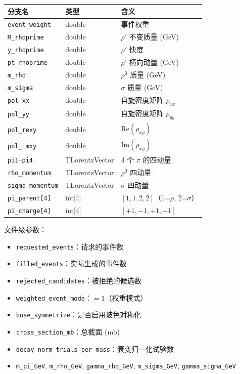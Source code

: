 \documentclass[11pt,a4paper,UTF8]{ctexart}
\begin{document}
\begin{longtable}{l l p{5cm}}
\toprule
\textbf{分支名} & \textbf{类型} & \textbf{含义} \\
\midrule
\texttt{event\_weight} & double & 事件权重 \\
\texttt{M\_rhoprime} & double & $\rho'$ 不变质量 (GeV) \\
\texttt{y\_rhoprime} & double & $\rho'$ 快度 \\
\texttt{pt\_rhoprime} & double & $\rho'$ 横向动量 (GeV) \\
\texttt{m\_rho} & double & $\rho^0$ 质量 (GeV) \\
\texttt{m\_sigma} & double & $\sigma$ 质量 (GeV) \\
\texttt{pol\_xx} & double & 自旋密度矩阵 $\rho_{xx}$ \\
\texttt{pol\_yy} & double & 自旋密度矩阵 $\rho_{yy}$ \\
\texttt{pol\_rexy} & double & $\text{Re}(\rho_{xy})$ \\
\texttt{pol\_imxy} & double & $\text{Im}(\rho_{xy})$ \\
\texttt{pi1}--\texttt{pi4} & TLorentzVector & 4 个 $\pi$ 的四动量 \\
\texttt{rho\_momentum} & TLorentzVector & $\rho^0$ 四动量 \\
\texttt{sigma\_momentum} & TLorentzVector & $\sigma$ 四动量 \\
\texttt{pi\_parent[4]} & int[4] & $[1,1,2,2]$（1=$\rho$, 2=$\sigma$） \\
\texttt{pi\_charge[4]} & int[4] & $[+1,-1,+1,-1]$ \\
\bottomrule
\end{longtable}

文件级参数：
\begin{itemize}[leftmargin=2em]
    \item \texttt{requested\_events}：请求的事件数
    \item \texttt{filled\_events}：实际生成的事件数
    \item \texttt{rejected\_candidates}：被拒绝的候选数
    \item \texttt{weighted\_event\_mode}：$=1$（权重模式）
    \item \texttt{bose\_symmetrize}：是否启用玻色对称化
    \item \texttt{cross\_section\_mb}：总截面 (mb)
    \item \texttt{decay\_norm\_trials\_per\_mass}：衰变归一化试验数
    \item \texttt{m\_pi\_GeV}, \texttt{m\_rho\_GeV}, \texttt{gamma\_rho\_GeV}, \texttt{m\_sigma\_GeV}, \texttt{gamma\_sigma\_GeV}
\end{itemize}
\end{document}
